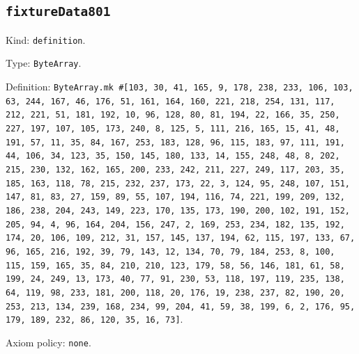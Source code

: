 \documentclass[11pt]{article}
\begin{document}
\subsection*{\texttt{fixtureData801}}
\noindent Kind: \texttt{definition}.\par
\noindent Type: \texttt{ByteArray}.\par
\noindent Definition: \texttt{ByteArray.mk \#[103, 30, 41, 165, 9, 178, 238, 233, 106, 103, 63, 244, 167, 46, 176, 51, 161, 164, 160, 221, 218, 254, 131, 117, 212, 221, 51, 181, 192, 10, 96, 128, 80, 81, 194, 22, 166, 35, 250, 227, 197, 107, 105, 173, 240, 8, 125, 5, 111, 216, 165, 15, 41, 48, 191, 57, 11, 35, 84, 167, 253, 183, 128, 96, 115, 183, 97, 111, 191, 44, 106, 34, 123, 35, 150, 145, 180, 133, 14, 155, 248, 48, 8, 202, 215, 230, 132, 162, 165, 200, 233, 242, 211, 227, 249, 117, 203, 35, 185, 163, 118, 78, 215, 232, 237, 173, 22, 3, 124, 95, 248, 107, 151, 147, 81, 83, 27, 159, 89, 55, 107, 194, 116, 74, 221, 199, 209, 132, 186, 238, 204, 243, 149, 223, 170, 135, 173, 190, 200, 102, 191, 152, 205, 94, 4, 96, 164, 204, 156, 247, 2, 169, 253, 234, 182, 135, 192, 174, 20, 106, 109, 212, 31, 157, 145, 137, 194, 62, 115, 197, 133, 67, 96, 165, 216, 192, 39, 79, 143, 12, 134, 70, 79, 184, 253, 8, 100, 115, 159, 165, 35, 84, 210, 210, 123, 179, 58, 56, 146, 181, 61, 58, 199, 24, 249, 13, 173, 40, 77, 91, 230, 53, 118, 197, 119, 235, 138, 64, 119, 98, 233, 181, 200, 118, 20, 176, 19, 238, 237, 82, 190, 20, 253, 213, 134, 239, 168, 234, 99, 204, 41, 59, 38, 199, 6, 2, 176, 95, 179, 189, 232, 86, 120, 35, 16, 73]}.\par
\noindent Axiom policy: \texttt{none}.\par
\end{document}
